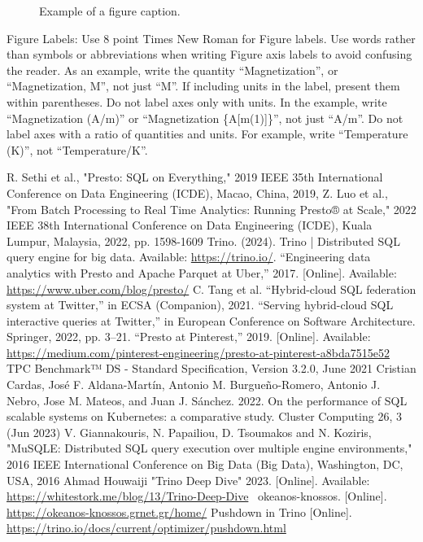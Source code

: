 \documentclass[conference]{IEEEtran}
\begin{document}
\begin{figure}[htbp]
	\caption{Example of a figure caption.}
	\label{fig}
\end{figure}

Figure Labels: Use 8 point Times New Roman for Figure labels. Use words
rather than symbols or abbreviations when writing Figure axis labels to
avoid confusing the reader. As an example, write the quantity
``Magnetization'', or ``Magnetization, M'', not just ``M''. If including
units in the label, present them within parentheses. Do not label axes only
with units. In the example, write ``Magnetization (A/m)'' or ``Magnetization
\{A[m(1)]\}'', not just ``A/m''. Do not label axes with a ratio of
quantities and units. For example, write ``Temperature (K)'', not
``Temperature/K''.

\begin{thebibliography}{00}
	 R. Sethi et al., "Presto: SQL on Everything," 2019 IEEE 35th International Conference on Data Engineering (ICDE), Macao, China, 2019,
	 Z. Luo et al., "From Batch Processing to Real Time Analytics: Running Presto® at Scale," 2022 IEEE 38th International Conference on Data Engineering (ICDE), Kuala Lumpur, Malaysia, 2022, pp. 1598-1609
	 Trino. (2024). Trino | Distributed SQL query engine for big data. Available: \href{https://trino.io/}{https://trino.io/}.
	 “Engineering data analytics with Presto and Apache Parquet at Uber,” 2017. [Online]. Available: \href{https://www.uber.com/blog/presto/}{https://www.uber.com/blog/presto/}
	 C. Tang et al. “Hybrid-cloud SQL federation system at Twitter,” in ECSA (Companion), 2021.
	 “Serving hybrid-cloud SQL interactive queries at Twitter,” in European Conference on Software Architecture. Springer, 2022, pp. 3–21.
	 “Presto at Pinterest,” 2019. [Online]. Available: \href{https://medium.com/pinterest-engineering/presto-at-pinterest-a8bda7515e52}{https://medium.com/pinterest-engineering/presto-at-pinterest-a8bda7515e52}
	 TPC Benchmark™ DS - Standard Specification, Version 3.2.0, June 2021
	 Cristian Cardas, José F. Aldana-Martín, Antonio M. Burgueño-Romero, Antonio J. Nebro, Jose M. Mateos, and Juan J. Sánchez. 2022. On the performance of SQL scalable systems on Kubernetes: a comparative study. Cluster Computing 26, 3 (Jun 2023)
	 V. Giannakouris, N. Papailiou, D. Tsoumakos and N. Koziris, "MuSQLE: Distributed SQL query execution over multiple engine environments," 2016 IEEE International Conference on Big Data (Big Data), Washington, DC, USA, 2016
	 Ahmad Houwaiji "Trino Deep Dive" 2023. [Online]. Available: \href{https://whitestork.me/blog/13/Trino-Deep-Dive}{https://whitestork.me/blog/13/Trino-Deep-Dive}
	 ~okeanos-knossos. [Online]. \href{https://okeanos-knossos.grnet.gr/home/}{https://okeanos-knossos.grnet.gr/home/}
	 Pushdown in Trino [Online]. \href{https://trino.io/docs/current/optimizer/pushdown.html}{https://trino.io/docs/current/optimizer/pushdown.html}
\end{thebibliography}
\end{document}
